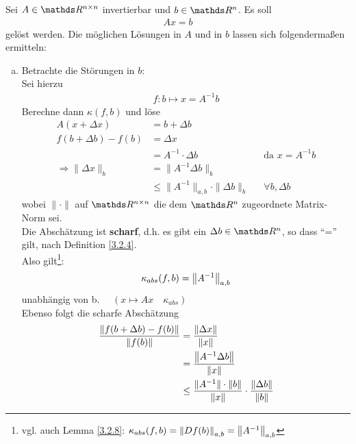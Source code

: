 \begin{Bspe}
  \label{3.2.10}
  Sei $A\in \R^{n\times n}$ invertierbar und $b\in \R^n$. Es soll 
  \begin{gather*}
    Ax =b
  \end{gather*}
  gelöst werden.
  Die möglichen Lösungen in $A$ und in $b$ lassen sich folgendermaßen ermitteln:
  \begin{enumerate}[a)]
  \item Betrachte die Störungen in $b$:\\
    Sei hierzu
    \begin{gather*}
      f: b\mapsto x= A^{-1}b 
    \end{gather*}
    Berechne dann $ \kappa(f,b)$ und löse 
    \begin{align*}
      A(x + \Delta x) &= b+\Delta b \\
      f(b + \Delta b) - f(b) &= \Delta x \\
                      &= A^{-1} \cdot \Delta b && \text{da }x = A^{-1}b \\
      \Rightarrow \|\Delta x\|_{b}  &= \|A^{-1}\Delta b\|_{b} \\
                      &\leq \|A^{-1}\|_{a,b}\cdot \|\Delta b\|_{b} && \forall b, \Delta b 
    \end{align*}
    wobei $\|\cdot\| $ auf $\Renn$ die dem $\Ren$ zugeordnete Matrix-Norm sei. \\
    Die Abschätzung ist \textbf{scharf}, 
    d.h. es gibt ein $\Delta b\in \R^n$, so dass \enquote{=} gilt, 
    nach Definition \ref{3.2.4}. \\
    Also gilt\footnote{vgl. auch Lemma \ref{3.2.8}: $\kappa_{abs}(f,b)=\left\| Df(b) \right\|_{a,b}=\left\| A^{-1} \right\|_{a,b}$}:
    \begin{gather}
      \kappa_{abs}(f,b) = \left\| A^{-1} \right\|_{a,b} \label{III.2.6}
    \end{gather}
    unabhängig von b.  $ \quad \left( x\mapsto Ax \quad \kappa_{abs}\right)$\\
    Ebenso folgt die scharfe Abschätzung 
    \begin{align}
      \nonumber
      \frac{\|	f(b + \Delta b) - f(b)\|}{\|f(b)\|} &= \frac{\nn{\Delta x}}{\nn{x}}\\ \nonumber
                                                    & = \frac{\nn{A^{-1}\Delta b}}{\nn{x}} \\ \nonumber
                                                    & \leq  \frac{\|A^{-1}\|\cdot \|b\|}{\|x\|} \cdot \frac{\|\Delta b\|}{\|b\|} \\

\end{align}
\end{enumerate}
\end{Bspe}
